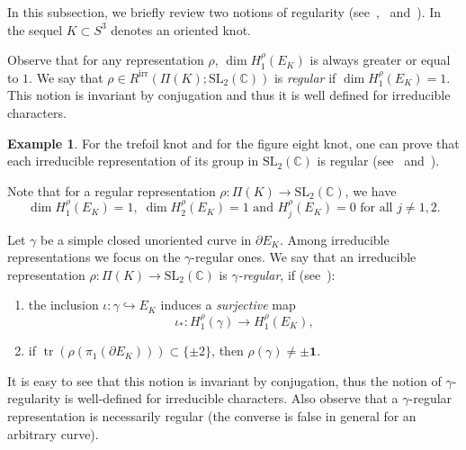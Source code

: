 \documentclass[a4paper]{amsart}
\theoremstyle{plain}
\theoremstyle{definition}
\newtheorem{example}{Example}%
\theoremstyle{remark}
\newcommand{\C}{{\mathbb C}}
\newcommand{\I}{\mathbf{1}}
\newcommand{\lk}{\ell\mathit{k}}
\newcommand{\bord}{\partial}
\newcommand{\SL}{{\mathrm{SL}_2(\C)}}
\newcommand{\tr}{\mathop{\mathrm{tr}}\nolimits}
\begin{document}
In this subsection, we briefly review two notions of regularity {(see~\cite{Heu:2003},~\cite{Porti:1997} and~\cite{JDFibre})}. In the sequel $K \subset S^3$ denotes an oriented knot. 



Observe that for any representation $\rho$, $\dim H_1^\rho(E_K)$ is always greater or equal to $1$. We say that $\rho \in R^\mathrm{irr}(\Pi(K); \SL)$ is \emph{regular} if $\dim H_1^\rho(E_K) = 1$. This notion is invariant by conjugation and thus it is well defined for irreducible characters.

\begin{example}
For the trefoil knot and for the figure eight knot, one can prove that each irreducible representation of its group in $\SL$ is regular (see~\cite{JDFourier} and~\cite{Porti:1997}). 
\end{example}

Note that for a regular representation $\rho\colon \Pi(K) \to \SL$, we have $$\dim H_1^\rho(E_K) = 1, \; \dim H_2^\rho(E_K) = 1 \text{ and } H_j^\rho(E_K) = 0 \text{ for all } j \ne 1, 2.$$ 

Let $\gamma$ be a simple closed unoriented curve in $\bord E_K$. Among irreducible representations we focus on the $\gamma$-regular ones. We say that an irreducible representation $\rho : \Pi(K) \to \SL$ is \emph{$\gamma$-regular}, if (see~\cite[Definition 3.21]{Porti:1997}):
\begin{enumerate}
  \item the inclusion $\iota \colon \gamma \hookrightarrow E_K$ induces a \emph{surjective} map $$\iota_* \colon H^\rho_1(\gamma) \to H^\rho_1(E_K),$$
  \item if $\tr(\rho(\pi_1(\bord E_K))) \subset \{\pm 2\}$, then $\rho(\gamma) \ne \pm \I$.
\end{enumerate} 
It is easy to see that this notion is invariant by conjugation, thus the notion of $\gamma$-regularity is well-defined for irreducible characters. Also observe that a $\gamma$-regular representation is necessarily regular (the converse is false in general for an arbitrary curve). 
\end{document}
